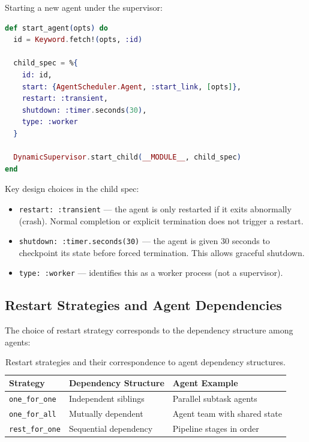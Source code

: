 \documentclass[12pt,a4paper]{article}
\theoremstyle{definition}
\theoremstyle{remark}
\begin{document}
Starting a new agent under the supervisor:

\begin{lstlisting}[language=elixir, caption={Starting a supervised agent (from \texttt{supervisor.ex})}, label={lst:start-agent}]
def start_agent(opts) do
  id = Keyword.fetch!(opts, :id)

  child_spec = %{
    id: id,
    start: {AgentScheduler.Agent, :start_link, [opts]},
    restart: :transient,
    shutdown: :timer.seconds(30),
    type: :worker
  }

  DynamicSupervisor.start_child(__MODULE__, child_spec)
end
\end{lstlisting}

Key design choices in the child spec:
\begin{itemize}[leftmargin=2em]
  \item \texttt{restart: :transient} --- the agent is only restarted if it exits abnormally (crash). Normal completion or explicit termination does not trigger a restart.
  \item \texttt{shutdown: :timer.seconds(30)} --- the agent is given 30 seconds to checkpoint its state before forced termination. This allows graceful shutdown.
  \item \texttt{type: :worker} --- identifies this as a worker process (not a supervisor).
\end{itemize}

\subsection{Restart Strategies and Agent Dependencies}

The choice of restart strategy corresponds to the dependency structure among agents:

\begin{table}[H]
\centering
\begin{tabular}{@{}lll@{}}
\toprule
\textbf{Strategy} & \textbf{Dependency Structure} & \textbf{Agent Example} \\
\midrule
\texttt{one\_for\_one} & Independent siblings & Parallel subtask agents \\
\texttt{one\_for\_all} & Mutually dependent & Agent team with shared state \\
\texttt{rest\_for\_one} & Sequential dependency & Pipeline stages in order \\
\bottomrule
\end{tabular}
\caption{Restart strategies and their correspondence to agent dependency structures.}\label{tab:restart-strategies}
\end{table}
\end{document}
